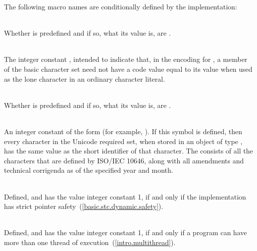 \pnum
The following macro names are conditionally defined by the implementation:

\begin{description}
\item {}\\
Whether  is predefined and if so, what its value is,
are .

%
%
\item {}\\
The integer constant , intended to indicate that, in the encoding for
, a member of the basic character set need not have a code value equal to
its value when used as the lone character in an ordinary character literal.

%
%
\item {}\\
Whether  is predefined and if so, what its value is,
are .

%
%
\item {}\\
An integer constant of the form  (for example,
).
If this symbol is defined, then every character in the Unicode required set, when
stored in an object of type , has the same value as the short identifier
of that character. The  consists of all
the characters that are defined by ISO/IEC 10646, along with
all amendments and technical corrigenda as of the specified year and month.

%
%
\item {}\\
Defined, and has the value integer constant 1, if and only if the implementation
has strict pointer safety~(\ref{basic.stc.dynamic.safety}).

%
%
\item {}\\
Defined, and has the value integer constant 1, if and only if a program
can have more than one thread of execution~(\ref{intro.multithread}).

\end{description}

